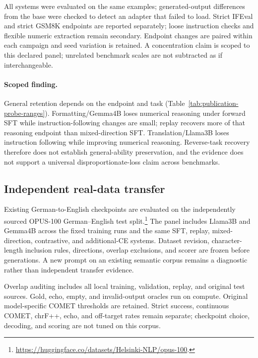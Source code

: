 All systems were evaluated on the same examples; generated-output differences from the
base were checked to detect an adapter that failed to load.
Strict IFEval and strict GSM8K endpoints are reported separately; loose instruction checks and flexible
numeric extraction remain secondary. Endpoint changes are paired within each campaign and seed
variation is retained. A concentration claim is scoped to this declared panel; unrelated benchmark scales
are not subtracted as if interchangeable.
\paragraph{Scoped finding.} General retention depends on the endpoint and task
(Table~\ref{tab:publication-probe-ranges}). Formatting/Gemma4B loses numerical reasoning
under forward SFT while instruction-following changes are small; replay recovers more of
that reasoning endpoint than mixed-direction SFT. Translation/Llama3B loses instruction
following while improving numerical reasoning. Reverse-task recovery therefore does not
establish general-ability preservation, and the evidence does not support a universal
disproportionate-loss claim across benchmarks.

\subsection{Independent real-data transfer}
\label{app:independent-transfer}

Existing German-to-English checkpoints are evaluated on the independently sourced OPUS-100
German--English test split.\footnote{\url{https://huggingface.co/datasets/Helsinki-NLP/opus-100}.}
The panel includes Llama3B and Gemma4B across the fixed training runs and the same SFT, replay,
mixed-direction, contrastive, and additional-CE systems. Dataset revision, character-length
inclusion rules, directions, overlap exclusions, and scorer are frozen before generations.
A new prompt on an existing semantic corpus remains a diagnostic rather than independent
transfer evidence.

Overlap auditing includes all local training, validation, replay, and original test sources.
Gold, echo, empty, and invalid-output oracles run on compute. Original model-specific COMET
thresholds are retained. Strict success, continuous COMET, chrF++, echo, and off-target rates
remain separate; checkpoint choice, decoding, and scoring are not tuned on this corpus.

